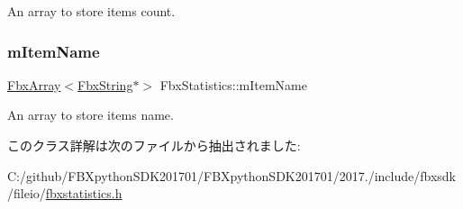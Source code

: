 An array to store item\textquotesingle{}s count. 

\mbox{\label{class_fbx_statistics_a91d987cd85cf3e567b9c309c9389f02d}} 
\subsubsection{\texorpdfstring{m\+Item\+Name}{mItemName}}
{\footnotesize\ttfamily \hyperlink{class_fbx_array}{Fbx\+Array}$<$\hyperlink{class_fbx_string}{Fbx\+String}$\ast$$>$ Fbx\+Statistics\+::m\+Item\+Name\hspace{0.3cm}{\ttfamily [protected]}}



An array to store item\textquotesingle{}s name. 



このクラス詳解は次のファイルから抽出されました\+:\begin{DoxyCompactItemize}
\item 
C\+:/github/\+F\+B\+Xpython\+S\+D\+K201701/\+F\+B\+Xpython\+S\+D\+K201701/2017./include/fbxsdk/fileio/\hyperlink{fbxstatistics_8h}{fbxstatistics.\+h}\end{DoxyCompactItemize}
